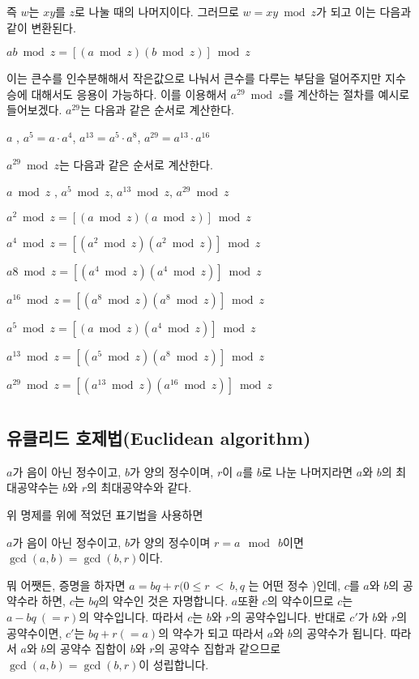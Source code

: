 \documentclass{oblivoir}
\begin{document}
즉 $w$는 $xy$를 $z$로 나눌 때의 나머지이다. 그러므로 $w=xy \bmod z$가 되고 이는 다음과 같이 변환된다.
\begin{center}
     $ab\bmod z= [(a\bmod z)(b \bmod z)]\bmod z$
\end{center}
이는 큰수를 인수분해해서 작은값으로 나눠서 큰수를 다루는 부담을 덜어주지만 지수승에 대해서도 응용이 가능하다.
이를 이용해서 $a^{29}\bmod z$를 계산하는 절차를 예시로 들어보겠다. $a^{29}$는 다음과 같은 순서로 계산한다.
\begin{center}
    $a$ , $a^{5}=a \cdot a^4$, $a^{13}=a^{5}\cdot a^{8}$, $a^{29}=a^{13}\cdot a^{16}$
\end{center}
$a^{29} \bmod z$는 다음과 같은 순서로 계산한다.
\begin{center}
    $a \bmod z$ , $a^{5}\bmod z$, $a^{13}\bmod z$, $a^{29}\bmod z$
\end{center}
\begin{center}
    $a^2 \bmod z=[(a\bmod z)(a\bmod z)]\bmod z$ \par
    $a^4 \bmod z=[(a^2\bmod z)(a^2\bmod z)]\bmod z$ \par
    $a8 \bmod z=[(a^4\bmod z)(a^4\bmod z)]\bmod z$ \par
    $a^{16} \bmod z=[(a^8\bmod z)(a^8\bmod z)]\bmod z$ \par
    $a^5 \bmod z=[(a\bmod z)(a^4\bmod z)]\bmod z$ \par
    $a^{13} \bmod z=[(a^5\bmod z)(a^8\bmod z)]\bmod z$ \par
    $a^{29} \bmod z=[(a^{13}\bmod z)(a^{16}\bmod z)]\bmod z$ \par
\end{center}

\newpage
\chapter{}
\section{유클리드 호제법(Euclidean algorithm)}
\begin{justbox}
$a$가 음이 아닌 정수이고, $b$가 양의 정수이며, $r$이 $a$를 $b$로 나눈 나머지라면 $a$와 $b$의 최대공약수는 $b$와 $r$의 최대공약수와 같다.
\end{justbox}
위 명제를 위에 적었던 표기법을 사용하면 \par
$a$가 음이 아닌 정수이고, $b$가 양의 정수이며 $r=a\:\bmod \: b$이면 $\gcd(a,b) = \gcd(b,r)$이다.
\par
뭐 어쨋든, 증명을 하자면 $a=bq +r (0 \le r\: <\: b , q$ 는 어떤 정수 )인데, $c$를 $a$와  $b$의 공약수라 하면, $c$는 $bq$의 약수인 것은 자명합니다. $a$또환 $c$의 약수이므로 $c$는 $a-bq\:(=r)$의 약수입니다. 따라서 $c$는 $b$와 $r$의 공약수입니다. 반대로 $c'$가 $b$와 $r$의 공약수이면, $c'$는 $bq+r(=a)$의 약수가 되고 따라서 $a$와 $b$의 공약수가 됩니다. 따라서 $a$와 $b$의 공약수 집합이 $b$와 $r$의 공약수 집합과 같으므로 $\gcd(a,b) = \gcd(b,r)$이 성립합니다.\par
\end{document}
